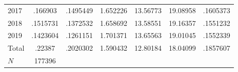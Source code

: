 {\begin{longtable}{l*{1}{cccccc}}
2017        &     .166903&    .1495449&    1.652226&    13.56773&    19.08958&    .1605373\\
2018        &    .1515731&    .1372532&    1.658692&    13.58551&    19.16357&    .1551232\\
2019        &    .1423604&    .1261151&    1.701371&    13.65563&    19.01045&    .1552339\\
Total       &      .22387&    .2020302&    1.590432&    12.80184&    18.04099&    .1857607\\
\hline
\(N\)       &      177396&            &            &            &            &            \\
\hline\hline
\end{longtable}
}
